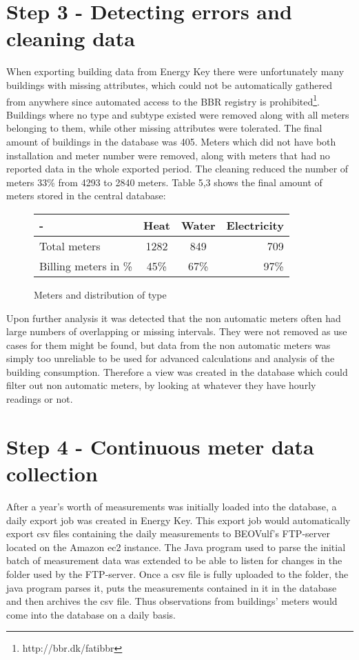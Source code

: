 \section*{Step 3 - Detecting errors and cleaning data}
When exporting building data from Energy Key there were unfortunately many buildings with missing attributes, which could not be automatically gathered from anywhere since automated access to the BBR registry is prohibited\footnote{http://bbr.dk/fatibbr}.  Buildings where no type and subtype existed were removed along with all meters belonging to them, while other missing attributes were tolerated. The final amount of buildings in the database was 405. Meters which did not have both installation and meter number were removed, along with meters that had no reported data in the whole exported period. The cleaning reduced the number of meters 33\% from 4293 to 2840 meters. Table 5,3 shows the final amount of meters stored in the central database:
\begin{figure}
\begin{center}
\begin{tabular}{| l | c | c | r |}
\hline 
  - & Heat & Water & Electricity \\ \hline 
  Total meters & 1282 & 849 & 709 \\ \hline 
  Billing meters in \% & 45\% & 67\% & 97\% \\ \hline
\end{tabular}
\end{center}
\caption{Meters and distribution of type}
\end{figure}

Upon further analysis it was detected that the non automatic meters often had large numbers of overlapping or missing intervals. They were not removed as use cases for them might be found, but data from the non automatic meters was simply too unreliable to be used for advanced calculations and analysis of the building consumption. Therefore a view was created in the database which could filter out non automatic meters, by looking at whatever they have hourly readings or not.
\section*{Step 4 - Continuous meter data collection}
After a year's worth of measurements was initially loaded into the database, a daily export job was created in Energy Key. This export job would automatically export csv files containing the daily measurements to BEOVulf’s FTP-server located on the Amazon ec2 instance. The Java program used to parse the initial batch of measurement data was extended to be able to listen for changes in the folder used by the FTP-server. Once a csv file is fully uploaded to the folder, the java program parses it, puts the measurements contained in it in the database and then archives the csv file. Thus observations from buildings’ meters would come into the database on a daily basis.

